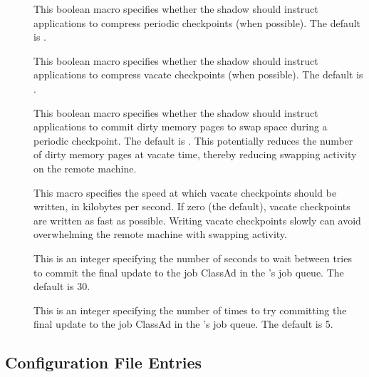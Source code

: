 \begin{description}
\item[]
  \label{param:CompressPeriodicCkpt} This boolean macro specifies
  whether the shadow should instruct applications to compress periodic
  checkpoints (when possible).  The default is .

\item[]
  \label{param:CompressVacateCkpt} This boolean macro specifies
  whether the shadow should instruct applications to compress vacate
  checkpoints (when possible).  The default is .

\item[] \label{param:PeriodicMemorySync}
  This boolean macro specifies whether the shadow should instruct
  applications to commit dirty memory pages to swap space during a
  periodic checkpoint.  The default is .  This potentially
  reduces the number of dirty memory pages at vacate time, thereby
  reducing swapping activity on the remote machine.

\item[] \label{param:SlowCkptSpeed}  This
  macro specifies the speed at which vacate checkpoints should be
  written, in kilobytes per second.  If zero (the default), vacate
  checkpoints are written as fast as possible.  Writing vacate
  checkpoints slowly can avoid overwhelming the remote machine with
  swapping activity.

\item[]
 \label{param:ShadowJobCleanupRetryDelay}
 This is an integer specifying the number of seconds to wait between tries
 to commit the final update to the job ClassAd in the 's
 job queue.  The default is 30.

\item[]
 \label{param:ShadowMaxJobCleanupRetries}
 This is an integer specifying the number of times to try committing
 the final update to the job ClassAd in the 's
 job queue.  The default is 5.

\end{description}

\subsection{\label{sec:Starter-Config-File-Entries}
Configuration File Entries}

